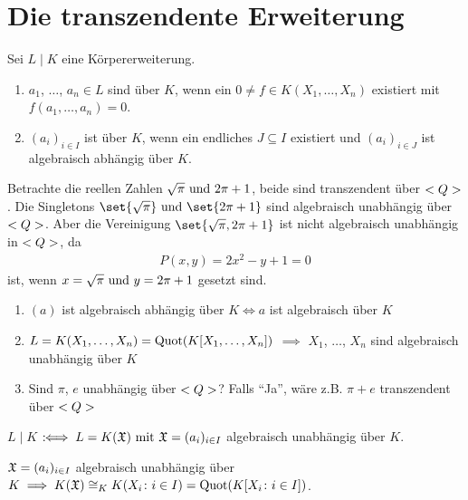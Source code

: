 \section{Die transzendente Erweiterung}
Sei $L\mid K$ eine Körpererweiterung.
\begin{definition}
	\begin{enumerate}[label=(\alph*)]
		\item $a_1$, $\dots$, $a_n \in L$ sind  über $K$, wenn ein $0 \neq f \in K(X_1,\dots, X_n)$ existiert mit  $f(a_1, \dots, a_n) = 0$.
		\item $(a_i)_{i\in I}$ ist  über $K$, wenn ein endliches $J \subseteq I$ existiert und $(a_i)_{i\in J}$ ist algebraisch abhängig über $K$.
	\end{enumerate}
\end{definition}
\begin{*example}
	Betrachte die reellen Zahlen $\sqrt{\pi} \text{ und } 2\pi +1$, beide sind transzendent über $<Q>$. Die Singletons $\set{\sqrt{\pi}}\und \set{2\pi +1}$ sind algebraisch unabhängig über $<Q>$. Aber die Vereinigung $\set{\sqrt{\pi}, 2\pi +1}$ ist nicht algebraisch unabhängig in $<Q>$, da
	\begin{align*}
		P(x,y) = 2x^2 - y + 1 = 0
	\end{align*}
	ist, wenn $x = \sqrt{\pi} \text{ und } y = 2\pi +1$ gesetzt sind.
\end{*example}
\begin{remark}
	\begin{enumerate}[label=(\alph*)]
		\item $(a)$ ist algebraisch abhängig über $K \iff a$ ist algebraisch über $K$
		\item $L = K(X_1,\dots, X_n) = \operatorname{Quot}(K[X_1,\dots, X_n])$ $\implies$ $X_1$, $\dots$, $X_n$ sind algebraisch unabhängig über $K$
		\item Sind $\pi$, $e$ unabhängig über $<Q>$?	Falls ``Ja'', wäre z.B. $\pi+e$ transzendent über $<Q>$
	\end{enumerate}
\end{remark}
\begin{definition}
	$L \mid K$  $:\!\!\iff L = K(\mathfrak{X}) \text{ mit } \mathfrak{X} = (a_i)_{i\in I}$ algebraisch unabhängig über $K$.
\end{definition}
\begin{lemma}
	$\mathfrak{X} = (a_i)_{i \in I}$ algebraisch unabhängig über $K \implies K(\mathfrak{X}) \cong_K K(X_i \colon i \in I) = \operatorname{Quot}(K[X_i \colon i \in I])$. 
\end{lemma}
